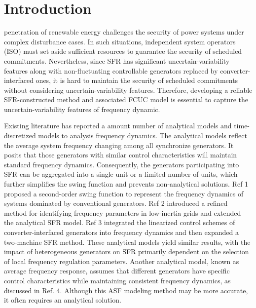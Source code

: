 \documentclass[lettersize,journal]{IEEEtran}
\begin{document}
\section{Introduction}
 penetration of renewable energy challenges the security of power systems under complex disturbance cases. In such situations, independent system operators (ISO) must set
aside sufficient resources to guarantee the security of scheduled commitments. Nevertheless, since SFR has significant uncertain-variability features along with non-fluctuating controllable generators
replaced by converter-interfaced ones, it is hard to maintain the security of scheduled commitments without considering uncertain-variability features. Therefore, developing a reliable SFR-constructed
method and associated FCUC model is essential to capture the uncertain-variability features of frequency dynamic.

Existing literature has reported a amount number of analytical models and time-discretized models to analysis frequency dynamics. The analytical models reflect the average system frequency changing
among all synchronize generators. It posits that those generators with similar control characteristics will maintain standard frequency dynamics.  Consequently, the generators participating into SFR
can be aggregated into a single unit or a limited number of units, which further simplifies the swing function and prevents non-analytical solutions. Ref 1 proposed a second-order swing function to
represent the frequency dynamics of systems dominated by conventional generators. Ref 2 introduced a refined method for identifying frequency parameters in low-inertia grids and extended the
analytical SFR model. Ref 3 integrated the linearized control schemes of converter-interfaced generators into frequency dynamics and then expanded a two-machine SFR method. These analytical models
yield similar results, with the impact of heterogeneous generators on SFR primarily dependent on the selection of local frequency regulation parameters. Another analytical model, known as average
frequency response, assumes that different generators have specific control characteristics while maintaining consistent frequency dynamics, as discussed in Ref. 4. Although this ASF modeling method
may be more accurate, it often requires an analytical solution.
\end{document}
